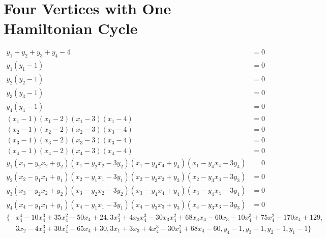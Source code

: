 \documentclass[letterpaper]{article}
\newcommand{\aln}[1]{\begin{align*} #1 \end{align*}} %
\begin{document}
\section{Four Vertices with One Hamiltonian Cycle}
\begin{center}
\end{center}
\aln{
	y_1 + y_2 + y_3 + y_4 - 4 &= 0\\
	y_1(y_1 - 1) &= 0\\
	y_2(y_2 - 1) &= 0\\
	y_3(y_3 - 1) &= 0\\
	y_4(y_4 - 1) &= 0\\
	(x_1 - 1)(x_1 - 2)(x_1 - 3)(x_1 - 4) &= 0\\
	(x_2 - 1)(x_2 - 2)(x_2 - 3)(x_3 - 4) &= 0\\
	(x_3 - 1)(x_3 - 2)(x_3 - 3)(x_3 - 4) &= 0\\
	(x_4 - 1)(x_4 - 2)(x_4 - 3)(x_4 - 4) &= 0\\
	y_1 (x_1 - y_2 x_2 + y_2)(x_1 - y_2 x_2 - 3y_2)(x_1 - y_4 x_4 + y_4)(x_1 - y_4 x_4 - 3y_4) &= 0\\
	y_2 (x_2 - y_1 x_1 + y_1)(x_2 - y_1 x_1 - 3y_1)(x_2 - y_3 x_3 + y_3)(x_2 - y_3 x_3 - 3y_3) &= 0\\
	y_3 (x_3 - y_2 x_2 + y_2)(x_3 - y_2 x_2 - 3y_2)(x_3 - y_4 x_4 + y_4)(x_3 - y_4 x_4 - 3y_4) &= 0\\
	y_4 (x_4 - y_1 x_1 + y_1)(x_4 - y_1 x_1 - 3y_1)(x_4 - y_3 x_3 + y_3)(x_4 - y_3 x_3 - 3y_3) &= 0
}
\aln{
	\{&x_4^4-10x_4^3+35x_4^2-50x_4+24, 3x_3^2+4x_3x_4^3-30x_3x_4^2+68x_3x_4-60x_3-10x_4^3+75x_4^2-170x_4+129,\\& 3x_2-4x_4^3+30x_4^2-65x_4+30, 3x_1+3x_3+4x_4^3-30x_4^2+68x_4-60, y_4-1, y_3-1, y_2-1, y_1-1\}
}


\newpage
\end{document}
